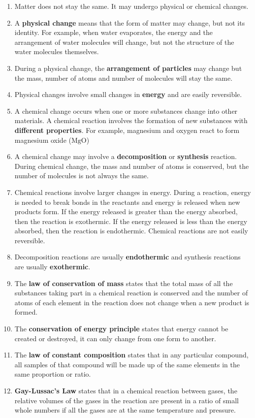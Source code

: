       \label{m38711*id65342}\begin{enumerate}[noitemsep, label=\textbf{\arabic*}. ] 
            \label{m38711*uid40}\item Matter does not stay the same. It may undergo physical or chemical changes.
\label{m38711*uid41}\item A \textbf{physical change} means that the form of matter may change, but not its identity. For example, when water evaporates, the energy and the arrangement of water molecules will change, but not the structure of the water molecules themselves.
\label{m38711*uid42}\item During a physical change, the \textbf{arrangement of particles} may change but the mass, number of atoms and number of molecules will stay the same.
\label{m38711*uid43}\item Physical changes involve small changes in \textbf{energy} and are easily reversible.
\label{m38711*uid44}\item A chemical change occurs when one or more substances change into other materials. A chemical reaction involves the formation of new substances with \textbf{different properties}. For example, magnesium and oxygen react to form magnesium oxide ($\mathrm{MgO}$) \label{m38711*uid45}\item A chemical change may involve a \textbf{decomposition} or \textbf{synthesis} reaction. During chemical change, the mass and number of atoms is conserved, but the number of molecules is not always the same.
\label{m38711*uid46}\item Chemical reactions involve larger changes in energy. During a reaction, energy is needed to break bonds in the reactants and energy is released when new products form. If the energy released is greater than the energy absorbed, then the reaction is exothermic. If the energy released is less than the energy absorbed, then the reaction is endothermic. Chemical reactions are not easily reversible.
\label{m38711*uid47}\item Decomposition reactions are usually \textbf{endothermic} and synthesis reactions are usually \textbf{exothermic}.
\label{m38711*uid48}\item The \textbf{law of conservation of mass} states that the total mass of all the substances taking part in a chemical reaction is conserved and the number of atoms of each element in the reaction does not change when a new product is formed.
\label{m38711*uid49}\item The \textbf{conservation of energy principle} states that energy cannot be created or destroyed, it can only change from one form to another.
\label{m38711*uid50}\item The \textbf{law of constant composition} states that in any particular compound, all samples of that compound will be made up of the same elements in the same proportion or ratio.
\label{m38711*uid51}\item \textbf{Gay-Lussac's Law} states that in a chemical reaction between gases, the relative volumes of the gases in the reaction are present in a ratio of small whole numbers if all the gases are at the same temperature and pressure.
\end{enumerate}
\label{m38711*secfhsst!!!underscore!!!id584}
